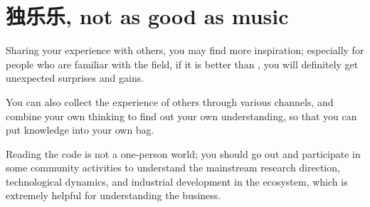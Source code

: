 \section{独乐乐, not as good as music}

\begin{content}

Sharing your experience with others, you may find more inspiration; especially for people who are familiar with the field, if it is better than , you will definitely get unexpected surprises and gains.

You can also collect the experience of others through various channels, and combine your own thinking to find out your own understanding, so that you can put knowledge into your own bag.

Reading the code is not a one-person world; you should go out and participate in some community activities to understand the mainstream research direction, technological dynamics, and industrial development in the ecosystem, which is extremely helpful for understanding the business.


\end{content}

